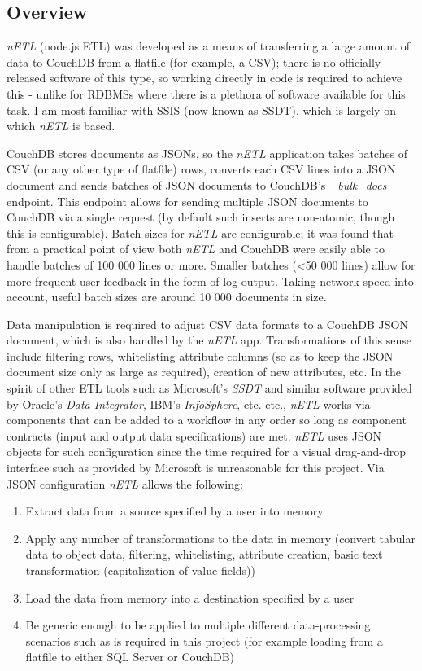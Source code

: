\subsection{Overview}
\textit{nETL} (node.js ETL) was developed as a means of transferring a large amount of data to CouchDB from a flatfile (for example, a CSV); there is no officially released software of this type, so working directly in code is required to achieve this - unlike for RDBMSs where there is a plethora of software available for this task. I am most familiar with SSIS (now known as SSDT). which is largely on which \textit{nETL} is based.

CouchDB stores documents as JSONs, so the \textit{nETL} application takes batches of CSV (or any other type of flatfile) rows, converts each CSV lines into a JSON document and sends batches of JSON documents to CouchDB's \textit{\_bulk\_docs} endpoint. This endpoint allows for sending multiple JSON documents to CouchDB via a single request (by default such inserts are non-atomic, though this is configurable). Batch sizes for \textit{nETL} are configurable; it was found that from a practical point of view both \textit{nETL} and CouchDB were easily able to handle batches of 100 000 lines or more. Smaller batches (\textless 50 000 lines) allow for more frequent user feedback in the form of log output. Taking network speed into account, useful batch sizes are around 10 000 documents in size.

Data manipulation is required to adjust CSV data formats to a CouchDB JSON document, which is also handled by the \textit{nETL} app. Transformations of this sense include filtering rows, whitelisting attribute columns (so as to keep the JSON document size only as large as required), creation of new attributes, etc. In the spirit of other ETL tools such as Microsoft's \textit{SSDT} and similar software provided by Oracle's \textit{Data Integrator}, IBM's \textit{InfoSphere}, etc. etc., \textit{nETL} works via components that can be added to a workflow in any order so long as component contracts (input and output data specifications) are met. \textit{nETL} uses JSON objects for such configuration since the time required for a visual drag-and-drop interface such as provided by Microsoft is unreasonable for this project. Via JSON configuration \textit{nETL} allows the following:

\begin{enumerate}
    \item Extract data from a source specified by a user into memory
    \item Apply any number of transformations to the data in memory (convert tabular data to object data, filtering, whitelisting, attribute creation, basic text transformation (capitalization of value fields))
    \item Load the data from memory into a destination specified by a user
    \item Be generic enough to be applied to multiple different data-processing scenarios such as is required in this project (for example loading from a flatfile to either SQL Server or CouchDB)
\end{enumerate}